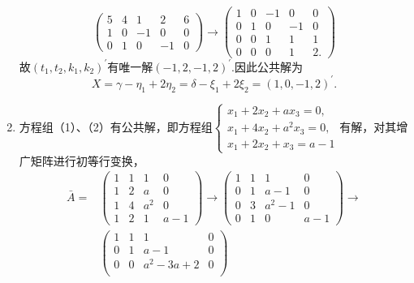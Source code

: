 \begin{enumerate}
\begin{equation*}
\begin{pmatrix}
                5 & 4 & 1 & 2 & 6 \\
                1 & 0 & -1 & 0 & 0 \\
                0 & 1 & 0 & -1 & 0
            \end{pmatrix}\rightarrow
            \begin{pmatrix}
                1 & 0 & -1 & 0 & 0 \\
                0 & 1 & 0 & -1 & 0 \\
                0 & 0 & 1 & 1 & 1 \\
                0 & 0 & 0 & 1 & 2.
            \end{pmatrix}
        \end{equation*}
        故$(t_1,t_2,k_1,k_2)^\prime$有唯一解$(-1,2,-1,2)^\prime$.因此公共解为
        \begin{equation*}
            X=\gamma-\eta_1+2\eta_2=\delta-\xi_1+2\xi_2=(1,0,-1,2)^\prime.
        \end{equation*}
    \item
        方程组（1）、（2）有公共解，即方程组$\begin{cases}
            x_1+2x_2+ax_3=0,\\
            x_1+4x_2+a^2x_3=0,\\
            x_1+2x_2+x_3=a-1
        \end{cases}$有解，对其增广矩阵进行初等行变换，
        \begin{align*}
            \bar{A}=&\begin{pmatrix}
                1 & 1 & 1 & 0 \\
                1 & 2 & a & 0 \\
                1 & 4 & a^2 & 0 \\
                1 & 2 & 1 & a-1
            \end{pmatrix}\rightarrow\begin{pmatrix}
                1 & 1 & 1 & 0 \\
                0 & 1 & a-1 & 0 \\
                0 & 3 & a^2-1 & 0 \\
                0 & 1 & 0 & a-1
            \end{pmatrix}\rightarrow\\&\begin{pmatrix}
                1 & 1 & 1 & 0 \\
                0 & 1 & a-1 & 0\\
                0 & 0 & a^2-3a+2 & 0\\

\end{pmatrix}
\end{align*}
\end{enumerate}

